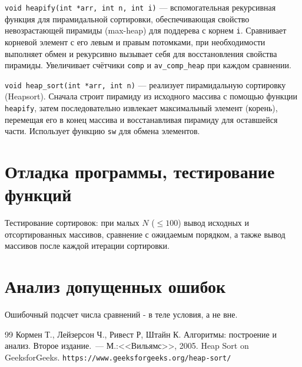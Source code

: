 \documentclass[a4paper,12pt,titlepage,finall]{article}
\begin{document}
\texttt{void heapify(int *arr, int n, int i)} — вспомогательная рекурсивная функция для пирамидальной сортировки, обеспечивающая свойство невозрастающей пирамиды (max-heap) для поддерева с корнем \texttt{i}. Сравнивает корневой элемент с его левым и правым потомками, при необходимости выполняет обмен и рекурсивно вызывает себя для восстановления свойства пирамиды. Увеличивает счётчики \texttt{comp} и \texttt{av\_comp\_heap} при каждом сравнении.

\texttt{void heap\_sort(int *arr, int n)} — реализует пирамидальную сортировку (Heapsort). Сначала строит пирамиду из исходного массива с помощью функции \texttt{heapify}, затем последовательно извлекает максимальный элемент (корень), перемещая его в конец массива и восстанавливая пирамиду для оставшейся части. Использует функцию \texttt{sw} для обмена элементов.

\section{Отладка программы, тестирование функций}
Тестирование сортировок: при малых $N$ ($\leq 100$) вывод исходных и отсортированных массивов, сравнение с ожидаемым порядком, а также вывод массивов после каждой итерации сортировки.

\section{Анализ допущенных ошибок}
Ошибочный подсчет числа сравнений - в теле условия, а не вне.

\begin{raggedright}
\begin{thebibliography}{99}
 Кормен Т., Лейзерсон Ч., Ривест Р, Штайн К. Алгоритмы: построение и анализ.
    Второе издание.~--- М.:<<Вильямс>>, 2005.
 Heap Sort on GeeksforGeeks.
    \texttt{https://www.geeksforgeeks.org/heap-sort/}
\end{thebibliography}
\end{raggedright}
\end{document}
